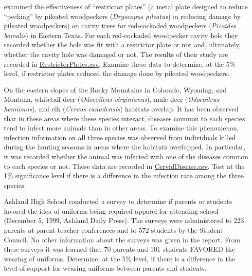 \documentclass[10pt,openany]{book}\usepackage[]{graphicx}\usepackage[]{color}
\begin{document}
\begin{exsection}
  \item \label{revex:ChiWoodpeckers} \rhw{} \cite{Saenzetal1998} examined the effectiveness of ``restrictor plates'' (a metal plate designed to reduce ``pecking'' by pileated woodpeckers (\emph{Dryocopus pileatus}) in reducing damage by pileated woodpeckers) on cavity trees for red-cockaded woodpeckers (\emph{Picoides borealis}) in Eastern Texas.  For each red-cockaded woodpecker cavity hole they recorded whether the hole was fit with a restrictor plate or not and, ultimately, whether the cavity hole was damaged or not.  The results of their study are recorded in \href{https://raw.githubusercontent.com/droglenc/NCData/master/RestrictorPlates.csv}{RestrictorPlates.csv}.  Examine these data to determine, at the 5\% level, if restrictor plates reduced the damage done by pileated woodpeckers. 

  \item \label{revex:ChiCervids} \rhw{} On the eastern slopes of the Rocky Mountains in Colorado, Wyoming, and Montana, whitetail deer (\textit{Odocoileus virginianus}), mule deer (\textit{Odocoileus hemionus}), and elk (\textit{Cervus canadensis}) habitats overlap.  It has been observed that in these areas where these species interact, diseases common to each species tend to infect more animals than in other areas.  To examine this phenomenon, infection information on all three species was observed from individuals killed during the hunting seasons in areas where the habitats overlapped.  In particular, it was recorded whether the animal was infected with one of the diseases common to each species or not.  These data are recorded in \href{https://raw.githubusercontent.com/droglenc/NCData/master/CervidDisease.csv}{CervidDisease.csv}.  Test at the 1\% significance level if there is a difference in the infection rate among the three species. 

  \item \label{revex:ChiAshland} \rhw{} Ashland High School conducted a survey to determine if parents or students favored the idea of uniforms being required apparel for attending school (December 5, 1999, Ashland Daily Press).  The surveys were administered to 223 parents at parent-teacher conferences and to 572 students by the Student Council.  No other information about the surveys was given in the report.  From these surveys it was learned that 70 parents and 101 students FAVORED the wearing of uniforms.  Determine, at the 5\% level, if there is a difference in the level of support for wearing uniforms between parents and students. 


\end{exsection}
\end{document}

